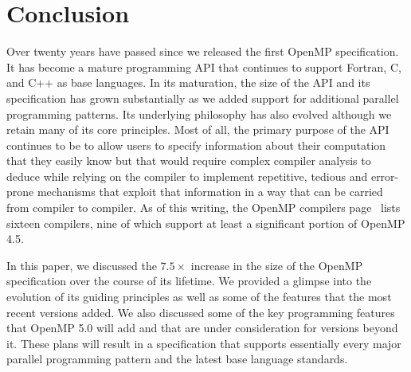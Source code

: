 \section{Conclusion}
\label{sec:conclusion}

Over twenty years have passed since we released the first OpenMP specification.
It has become a mature programming API that continues to support Fortran, C, and
C++ as base languages. In its maturation, the size of the API and its
specification has grown substantially as we added support for additional
parallel programming patterns. Its underlying philosophy has also evolved
although we retain many of its core principles. Most of all, the primary purpose
of the API continues to be to allow users to specify information about their
computation that they easily know but that would require complex compiler
analysis to deduce while relying on the compiler to implement repetitive,
tedious and error-prone mechanisms that exploit that information in a way that
can be carried from compiler to compiler.  As of this writing, the OpenMP 
compilers page~\cite{openmp-compilers} lists sixteen compilers, nine of 
which support at least a significant portion of OpenMP 4.5.

In this paper, we discussed the $7.5\times$ increase in the size of the 
OpenMP specification over the course of its lifetime. We provided 
a glimpse into the evolution of its guiding principles as well as
some of the features that the most recent versions added. We also
discussed some of the key programming features that OpenMP 5.0 will
add and that are under consideration for versions beyond it. These
plans will result in a specification that supports essentially every 
major parallel programming pattern and the latest base language standards.


